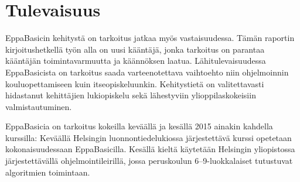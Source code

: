 \section{Tulevaisuus}
EppaBasicin kehitystä on tarkoitus
jatkaa myös vastaisuudessa.
Tämän raportin kirjoitushetkellä työn alla
on uusi kääntäjä,
jonka tarkoitus on parantaa kääntäjän
toimintavarmuutta ja käännöksen laatua.
Lähitulevaisuudessa EppaBasicista on tarkoitus
saada varteenotettava vaihtoehto niin ohjelmoinnin
kouluopettamiseen kuin itseopiskeluunkin.
Kehitystietä on valitettavasti hidastanut kehittäjien
lukiopiskelu sekä lähestyviin ylioppilaskokeisiin
valmistautuminen.

EppaBasicia on tarkoitus kokeilla keväällä
ja kesällä 2015 ainakin kahdella kurssilla:
Keväällä Helsingin luonnontiedelukiossa
järjestettävä kurssi opetetaan kokonaisuudessaan
EppaBasicilla.
Kesällä kieltä käytetään
Helsingin yliopistossa järjestettävällä
ohjelmointileirillä, jossa peruskoulun
6--9-luokkalaiset tutustuvat
algoritmien toimintaan.